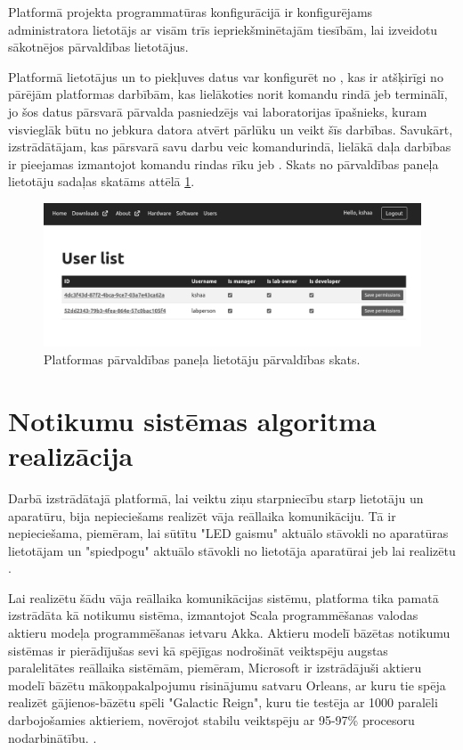 Platformā projekta programmatūras konfigurācijā ir konfigurējams administratora
lietotājs ar visām trīs iepriekšminētajām tiesībām, lai izveidotu sākotnējos
pārvaldības lietotājus.

Platformā lietotājus un to piekļuves datus var konfigurēt no
, kas ir atšķirīgi no pārējām platformas
darbībām, kas lielākoties norit komandu rindā jeb terminālī, jo šos datus
pārsvarā pārvalda pasniedzējs vai laboratorijas īpašnieks, kuram visvieglāk būtu
no jebkura datora atvērt pārlūku un veikt šīs darbības. Savukārt, izstrādātājam,
kas pārsvarā savu darbu veic komandurindā, lielākā daļa darbības ir pieejamas
izmantojot komandu rindas rīku jeb . Skats no
pārvaldības paneļa lietotāju sadaļas skatāms attēlā \ref{fig:mgmtpanelusr}.

\begin{figure}[H]
    \includegraphics[width=0.9\linewidth]{assets/mgmt-panel-usr-gray.png}
    \centering
    \caption{Platformas pārvaldības paneļa lietotāju pārvaldības skats.}
    \label{fig:mgmtpanelusr}
\end{figure}

\section{Notikumu sistēmas algoritma realizācija}
\label{sec:dipactorsystem}

Darbā izstrādātajā platformā, lai veiktu ziņu starpniecību starp lietotāju un
aparatūru, bija nepieciešams realizēt vāja reāllaika komunikāciju. Tā ir
nepieciešama, piemēram, lai sūtītu "LED gaismu" aktuālo stāvokli no aparatūras
lietotājam un "spiedpogu" aktuālo stāvokli no lietotāja aparatūrai jeb lai
realizētu .

Lai realizētu šādu vāja reāllaika komunikācijas sistēmu, platforma tika pamatā
izstrādāta kā notikumu sistēma, izmantojot Scala programmēšanas valodas aktieru
modeļa programmēšanas ietvaru Akka. Aktieru modelī bāzētas notikumu sistēmas ir
pierādījušas sevi kā spējīgas nodrošināt veiktspēju augstas paralelitātes
reāllaika sistēmām, piemēram, Microsoft ir izstrādājuši aktieru modelī bāzētu
mākoņpakalpojumu risinājumu satvaru Orleans, ar kuru tie spēja realizēt
gājienos-bāzētu spēli "Galactic Reign", kuru tie testēja ar 1000 paralēli
darbojošamies aktieriem, novērojot stabilu veiktspēju ar 95-97\% procesoru
nodarbinātību. \cite[para. 5.1, 5.2]{Bernstein2014}.

